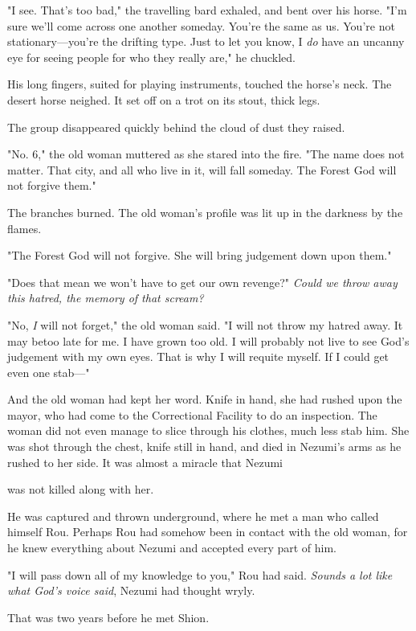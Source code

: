 "I see. That's too bad," the travelling bard exhaled, and bent over his
horse. "I'm sure we'll come across one another someday. You're the same
as us. You're not stationary---you're the drifting type. Just to let you
know, I \emph{do} have an uncanny eye for seeing people for who they really
are," he chuckled.

His long fingers, suited for playing instruments, touched the horse's
neck. The desert horse neighed. It set off on a trot on its stout, thick
legs.

The group disappeared quickly behind the cloud of dust they raised.

"No. 6," the old woman muttered as she stared into the fire. "The name
does not matter. That city, and all who live in it, will fall someday.
The Forest God will not forgive them."

The branches burned. The old woman's profile was lit up in the darkness
by the flames.

"The Forest God will not forgive. She will bring judgement down upon
them."

"Does that mean we won't have to get our own revenge?" \emph{Could we throw
away this hatred, the memory of that scream?}

"No, \emph{I} will not forget," the old woman said. "I will not throw my hatred
away. It may be\el too late for me. I have grown too old. I will
probably not live to see God's judgement with my own eyes. That is why I
will requite myself. If I could get even one stab---"

And the old woman had kept her word. Knife in hand, she had rushed upon
the mayor, who had come to the Correctional Facility to do an
inspection. The woman did not even manage to slice through his clothes,
much less stab him. She was shot through the chest, knife still in hand,
and died in Nezumi's arms as he rushed to her side. It was almost a
miracle that Nezumi~

was not killed along with her.

He was captured and thrown underground, where he met a man who called
himself Rou. Perhaps Rou had somehow been in contact with the old woman,
for he knew everything about Nezumi and accepted every part of him.

"I will pass down all of my knowledge to you," Rou had said. \emph{Sounds a
lot like what God's voice said}, Nezumi had thought wryly.

That was two years before he met Shion.

\myspace

